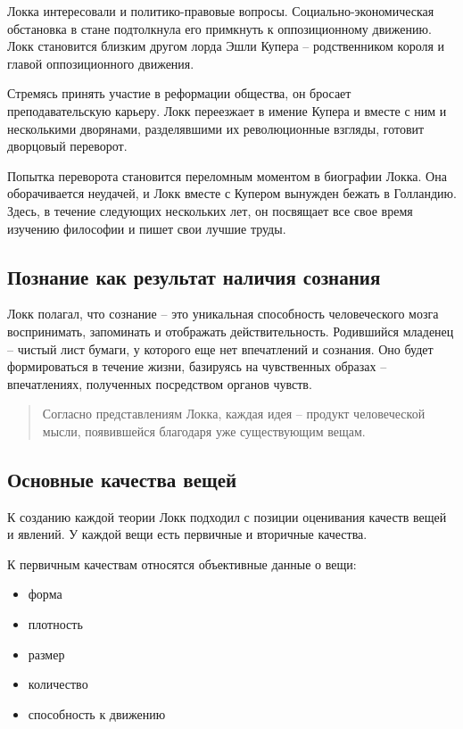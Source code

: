 \documentclass[a4paper, 14pt]{extreport}
\begin{document}
Локка интересовали и политико-правовые вопросы. Социально-экономическая
обстановка в стане подтолкнула его примкнуть к оппозиционному движению.
Локк становится близким другом лорда Эшли Купера -- родственником короля
и главой оппозиционного движения.

Стремясь принять участие в реформации общества, он бросает
преподавательскую карьеру. Локк переезжает в имение Купера и вместе с
ним и несколькими дворянами, разделявшими их революционные взгляды,
готовит дворцовый переворот.

Попытка переворота становится переломным моментом в биографии Локка. Она
оборачивается неудачей, и Локк вместе с Купером вынужден бежать в
Голландию. Здесь, в течение следующих нескольких лет, он посвящает все
свое время изучению философии и пишет свои лучшие труды.

\subsection{Познание как результат наличия сознания}

Локк полагал, что сознание -- это уникальная способность человеческого
мозга воспринимать, запоминать и отображать действительность. Родившийся
младенец -- чистый лист бумаги, у которого еще нет впечатлений и
сознания. Оно будет формироваться в течение жизни, базируясь на
чувственных образах -- впечатлениях, полученных посредством органов
чувств.

\begin{quote}
Согласно представлениям Локка, каждая идея -- продукт человеческой
мысли, появившейся благодаря уже существующим вещам.
\end{quote}

\subsection{Основные качества вещей}

К созданию каждой теории Локк подходил с позиции оценивания качеств
вещей и явлений. У каждой вещи есть первичные и вторичные качества.

К первичным качествам относятся объективные данные о вещи:

\begin{itemize}

\item
  форма
\item
  плотность
\item
  размер
\item
  количество
\item
  способность к движению
\end{itemize}
\end{document}
